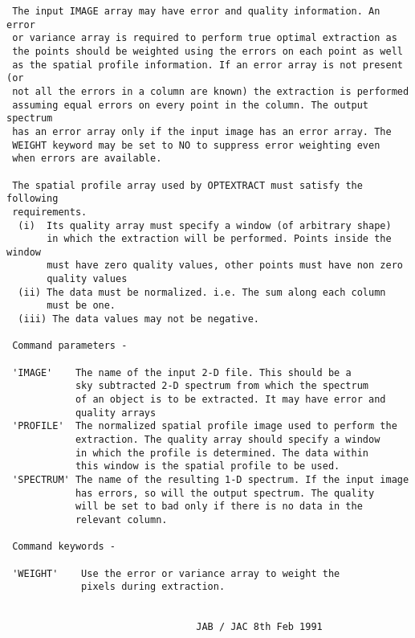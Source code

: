 \begin{description}
\begin{verbatim}
 The input IMAGE array may have error and quality information. An error
 or variance array is required to perform true optimal extraction as
 the points should be weighted using the errors on each point as well
 as the spatial profile information. If an error array is not present (or
 not all the errors in a column are known) the extraction is performed
 assuming equal errors on every point in the column. The output spectrum
 has an error array only if the input image has an error array. The
 WEIGHT keyword may be set to NO to suppress error weighting even
 when errors are available.

 The spatial profile array used by OPTEXTRACT must satisfy the following
 requirements.
  (i)  Its quality array must specify a window (of arbitrary shape)
       in which the extraction will be performed. Points inside the window
       must have zero quality values, other points must have non zero
       quality values
  (ii) The data must be normalized. i.e. The sum along each column
       must be one.
  (iii) The data values may not be negative.

 Command parameters -

 'IMAGE'    The name of the input 2-D file. This should be a
            sky subtracted 2-D spectrum from which the spectrum
            of an object is to be extracted. It may have error and
            quality arrays
 'PROFILE'  The normalized spatial profile image used to perform the
            extraction. The quality array should specify a window
            in which the profile is determined. The data within
            this window is the spatial profile to be used.
 'SPECTRUM' The name of the resulting 1-D spectrum. If the input image
            has errors, so will the output spectrum. The quality
            will be set to bad only if there is no data in the
            relevant column.

 Command keywords -

 'WEIGHT'    Use the error or variance array to weight the
             pixels during extraction.


                                 JAB / JAC 8th Feb 1991
\end{verbatim}
\end{description}
